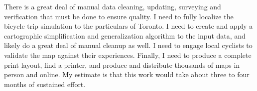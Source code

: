 \documentclass{article}
\begin{document}
		There is a great deal of manual data cleaning, updating, surveying and verification that must be done to ensure quality. I need to fully localize the bicycle trip simulation to the particulars of Toronto. I need to create and apply a cartographic simplification and generalization algorithm to the input data, and likely do a great deal of manual cleanup as well. I need to engage local cyclists to validate the map against their experiences. Finally, I need to produce a complete print layout, find a printer, and produce and distribute thousands of maps in person and online. My estimate is that this work would take about three to four months of sustained effort. 
		
		
	
\end{document}
